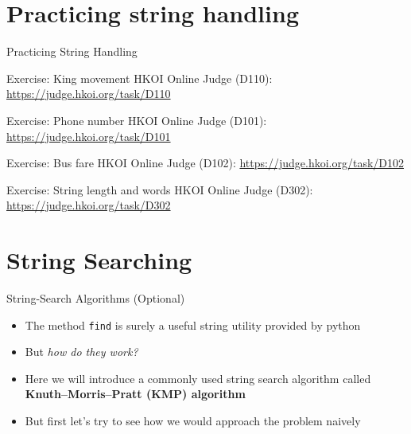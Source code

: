 \documentclass[10pt,xcolor={table,dvipsnames},t]{beamer}
\begin{document}
\section{Practicing string handling}

\begin{frame}{Practicing String Handling}
  \begin{exampleblock}{Exercise: King movement}
    HKOI Online Judge (D110): \url{https://judge.hkoi.org/task/D110}
  \end{exampleblock}
  \begin{exampleblock}{Exercise: Phone number}
    HKOI Online Judge (D101): \url{https://judge.hkoi.org/task/D101}
  \end{exampleblock}
  \begin{exampleblock}{Exercise: Bus fare}
    HKOI Online Judge (D102): \url{https://judge.hkoi.org/task/D102}
  \end{exampleblock}
  \begin{exampleblock}{Exercise: String length and words}
    HKOI Online Judge (D302): \url{https://judge.hkoi.org/task/D302}
  \end{exampleblock}
\end{frame}

\section{String Searching}

\begin{frame}{String-Search Algorithms (Optional)}
  \begin{itemize}
    \item The method \texttt{find} is surely a useful string utility provided by python
    \item But \textit{how do they work?}
    \item Here we will introduce a commonly used string search algorithm called \textbf{Knuth–Morris–Pratt (KMP) algorithm}
    \item But first let's try to see how we would approach the problem naively
  \end{itemize}
\end{frame}
\end{document}
